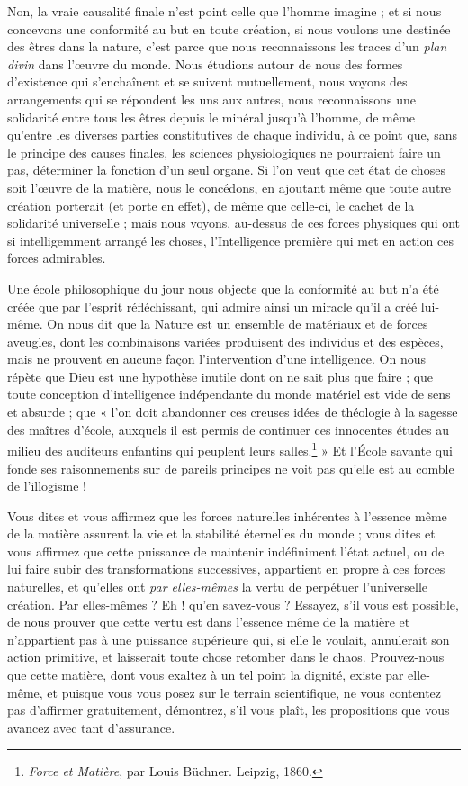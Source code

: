 \documentclass[a4paper, 11pt, oneside, landscape]{article}
\begin{document}
Non, la vraie causalité finale n'est point celle que l'homme imagine ; et si nous concevons une conformité au but en toute création, si nous voulons une destinée des êtres dans la nature, c'est parce que nous reconnaissons les traces d'un \emph{plan divin} dans l'œuvre du monde. Nous étudions autour de nous des formes d'existence qui s'enchaînent et se suivent mutuellement, nous voyons des arrangements qui se répondent les uns aux autres, nous reconnaissons une solidarité entre tous les êtres depuis le minéral jusqu'à l'homme, de même qu'entre les diverses parties constitutives de chaque individu, à ce point que, sans le principe des causes finales, les sciences physiologiques ne pourraient faire un pas, déterminer la fonction d'un seul organe. Si l'on veut que cet état de choses soit l'œuvre de la matière, nous le concédons, en ajoutant même que toute autre création porterait (et porte en effet), de même que celle-ci, le cachet de la solidarité universelle ; mais nous voyons, au-dessus de ces forces physiques qui ont si intelligemment arrangé les choses, l'Intelligence première qui met en action ces forces admirables.

Une école philosophique du jour nous objecte que la conformité au but n'a été créée que par l'esprit réfléchissant, qui admire ainsi un miracle qu'il a créé lui-même. On nous dit que la Nature est un ensemble de matériaux et de forces aveugles, dont les combinaisons variées produisent des individus et des espèces, mais ne prouvent en aucune façon l'intervention d'une intelligence. On nous répète que Dieu est une hypothèse inutile dont on ne sait plus que faire ; que toute conception d'intelligence indépendante du monde matériel est vide de sens et absurde ; que « l'on doit abandonner ces creuses idées de théologie à la sagesse des maîtres d'école, auxquels il est permis de continuer ces innocentes études au milieu des auditeurs enfantins qui peuplent leurs salles.\footnote{\emph{Force et Matière}, par Louis Büchner. Leipzig, 1860.} » Et l'École savante qui fonde ses raisonnements sur de pareils principes ne voit pas qu'elle est au comble de l'illogisme !

Vous dites et vous affirmez que les forces naturelles inhérentes à l'essence même de la matière assurent la vie et la stabilité éternelles du monde ; vous dites et vous affirmez que cette puissance de maintenir indéfiniment l'état actuel, ou de lui faire subir des transformations successives, appartient en propre à ces forces naturelles, et qu'elles ont \emph{par elles-mêmes} la vertu de perpétuer l'universelle création. Par elles-mêmes ? Eh ! qu'en savez-vous ? Essayez, s'il vous est possible, de nous prouver que cette vertu est dans l'essence même de la matière et n'appartient pas à une puissance supérieure qui, si elle le voulait, annulerait son action primitive, et laisserait toute chose retomber dans le chaos. Prouvez-nous que cette matière, dont vous exaltez à un tel point la dignité, existe par elle-même, et puisque vous vous posez sur le terrain scientifique, ne vous contentez pas d'affirmer gratuitement, démontrez, s'il vous plaît, les propositions que vous avancez avec tant d'assurance.
\end{document}

